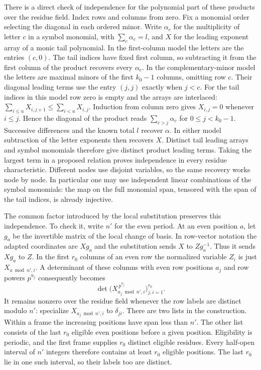 \documentclass[11pt]{amsart}
\theoremstyle{definition}
\theoremstyle{remark}
\begin{document}
There is a direct check of independence for the polynomial part of
these products over the residue field. Index rows and columns from
zero. Fix a monomial order selecting the diagonal in each ordered
minor. Write $\alpha_c$ for the multiplicity of letter $c$ in a
symbol monomial, with $\sum_c\alpha_c=l$, and $X$ for the leading
exponent array of a monic tail polynomial. In the first-column
model the letters are the entries $(c,0)$. The tail indices have
fixed first column, so subtracting it from the first column of the
product recovers every $\alpha_c$. In the complementary-minor
model the letters are maximal minors of the first $k_0-1$ columns,
omitting row $c$. Their diagonal leading terms use the entry
$(j,j)$ exactly when $j<c$. For the tail indices in this model
row zero is empty and the arrays are interlaced:
$\sum_{i\le u}X_{i,j+1}\le\sum_{i<u}X_{i,j}$. Induction from
column zero gives $X_{i,j}=0$ whenever $i\le j$. Hence the
diagonal of the product reads $\sum_{c>j}\alpha_c$ for
$0\le j<k_0-1$. Successive differences and the known total $l$
recover $\alpha$. In either model subtraction of the letter
exponents then recovers $X$. Distinct tail leading arrays and
symbol monomials therefore give distinct product leading terms.
Taking the largest term in a proposed relation proves independence
in every residue characteristic. Different nodes use disjoint
variables, so the same recovery works node by node.
In particular one may use independent linear combinations of the
symbol monomials: the map on the full monomial span, tensored with
the span of the tail indices, is already injective.

The common factor introduced by the local substitution preserves
this independence. To check it, write $n'$ for the even period.
At an even position $a$, let $g_a$ be the invertible matrix of
the local change of basis. In row-vector notation the adapted
coordinates are $Xg_a$ and the substitution sends $X$ to
$Zg_a^{-1}$. Thus it sends $Xg_a$ to $Z$. In the first $r_0$
columns of an even row the normalized variable $Z_i$ is just
$X_{a\bmod n',i}$. A determinant of these columns with even row
positions $a_j$ and row powers $p^{u_j}$ consequently becomes
\[
 \det\bigl(X_{a_j\bmod n',i}^{\,p^{u_j}}\bigr)_{j,i=1}^{r_0}.
\]
It remains nonzero over the residue field whenever the row labels
are distinct modulo $n'$: specialize $X_{a_j\bmod n',i}$ to
$\delta_{ji}$. There are two lists in the construction. Within
a frame the increasing positions have span less than $n'$. The
other list consists of the last $r_0$ eligible even positions
before a given position. Eligibility is periodic, and the first
frame supplies $r_0$ distinct eligible residues. Every half-open
interval of $n'$ integers therefore contains at least $r_0$
eligible positions. The last $r_0$ lie in one such interval, so
their labels too are distinct.
\end{document}
